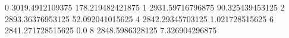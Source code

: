 0 3019.4912109375 178.219482421875
1 2931.59716796875 90.325439453125
2 2893.36376953125 52.092041015625
4 2842.29345703125 1.021728515625
6 2841.271728515625 0.0
8 2848.5986328125 7.326904296875
